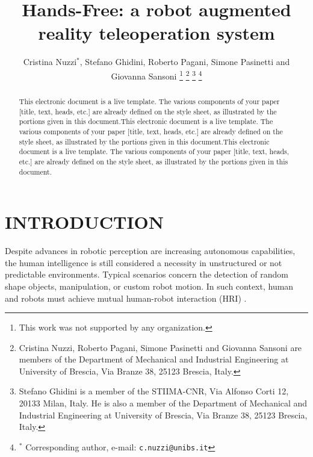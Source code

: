 \documentclass[a4paper, 10pt, conference]{ieeeconf}      %
\title{\LARGE \bf
Hands-Free: a robot augmented reality teleoperation system
}
\author{Cristina Nuzzi$^{*}$, Stefano Ghidini, Roberto Pagani, Simone Pasinetti and Giovanna Sansoni %
\thanks{This work was not supported by any organization.}%
\thanks{Cristina Nuzzi, Roberto Pagani, Simone Pasinetti and Giovanna Sansoni are members of the Department of Mechanical and Industrial Engineering at University of Brescia, Via Branze 38, 25123 Brescia, Italy.}
\thanks{Stefano Ghidini is a member of the STIIMA-CNR, Via Alfonso Corti 12, 20133 Milan, Italy. He is also a member of the Department of Mechanical and Industrial Engineering at University of Brescia, Via Branze 38, 25123 Brescia, Italy.}
\thanks{$^{*}$ Corresponding author, e-mail: {\tt\small c.nuzzi@unibs.it}}%
}
\begin{document}
\maketitle
\thispagestyle{empty}
\pagestyle{empty}

\begin{abstract}

This electronic document is a live template. The various components of your paper [title, text, heads, etc.] are already defined on the style sheet, as illustrated by the portions given in this document.This electronic document is a live template. The various components of your paper [title, text, heads, etc.] are already defined on the style sheet, as illustrated by the portions given in this document.This electronic document is a live template. The various components of your paper [title, text, heads, etc.] are already defined on the style sheet, as illustrated by the portions given in this document.


\end{abstract}


\section{INTRODUCTION}
Despite advances in robotic perception are increasing autonomous capabilities, the human intelligence is still considered a necessity in unstructured or not predictable environments. Typical scenarios concern the detection of random shape objects, manipulation, or custom robot motion. In such context, human and robots must achieve mutual human-robot interaction (HRI) \cite{Yanco2002}.
\end{document}
